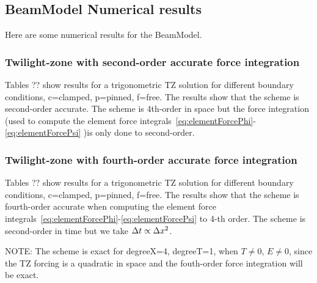 \documentclass[11pt]{article}
\newcommand{\dt}{{\Delta t}}
\begin{document}
\clearpage
\subsection{BeamModel Numerical results} \label{eq:BeamModel_Results}


Here are some numerical results for the BeamModel.


\subsubsection{Twilight-zone with second-order accurate force integration} 

Tables ?? show results for a trigonometric TZ solution for different boundary conditions, c=clamped, p=pinned, f=free.
The results show that the scheme is second-order accurate. 
The scheme is 4th-order in space but the force integration (used to compute the element
force integrals~\eqref{eq:elementForcePhi}-\eqref{eq:elementForcePsi} )is only done to second-order.

{
 
 
 
}


\subsubsection{Twilight-zone with fourth-order accurate force integration} 

Tables ?? show results for a trigonometric TZ solution for different boundary conditions, c=clamped, p=pinned, f=free.
The results show that the scheme is fourth-order accurate when computing the
element
force integrals~\eqref{eq:elementForcePhi}-\eqref{eq:elementForcePsi} to 4-th order.
The scheme is second-order in time but we take $\dt \propto \dx^2$. 

NOTE: The scheme is exact for degreeX=4, degreeT=1, when $T \ne 0$, $E\ne 0$, since the TZ forcing is a quadratic in space
and the fouth-order force integration will be exact.
\end{document}
